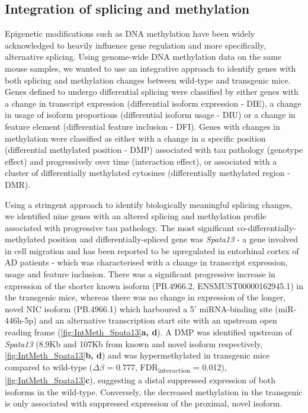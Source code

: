 \clearpage
\subsection{Integration of splicing and methylation}
Epigenetic modifications such as DNA methylation have been widely acknowledged to heavily influence gene regulation and more specifically, alternative splicing. Using genome-wide DNA methylation data on the same mouse samples, we wanted to use an integrative approach to identify genes with both splicing and methylation changes between wild-type and transgenic mice. Genes defined to undergo differential splicing were classified by either genes with a change in transcript expression (differential isoform expression - DIE), a change in usage of isoform proportions (differential isoform usage - DIU) or a change in feature element (differential feature inclusion - DFI). Genes with changes in methylation were classified as either with a change in a specific position (differential methylated position - DMP) associated with tau pathology (genotype effect) and progressively over time (interaction effect), or associated with a cluster of differentially methylated cytosines (differentially methylated region - DMR). 

Using a stringent approach to identify biologically meaningful splicing changes, we identified nine genes with an altered splicing and methylation profile associated with progressive tau pathology. The most significant co-differentially-methylated position and differentially-spliced gene was \textit{Spata13} - a gene involved in cell migration\cite{Bourbia2019} and has been reported to be upregulated in entorhinal cortex of AD patients\cite{Yan2019} - which was characterised with a change in transcript expression, usage and feature inclusion. There was a significant progressive increase in expression of the shorter known isoform (PB.4966.2, ENSMUST00000162945.1) in the transgenic mice, whereas there was no change in expression of the longer, novel NIC isoform (PB.4966.1) which harboured a 5' miRNA-binding site (miR-446h-5p) and an alternative transcription start site with an upstream open reading frame (\cref{fig:IntMeth_Spata13}\textbf{a, d}). A DMP was identified upstream of \textit{Spata13} (8.9Kb and 107Kb from known and novel isoform respectively, \cref{fig:IntMeth_Spata13}\textbf{b, d}) and was hypermethylated in transgenic mice compared to wild-type ($\Delta$$\beta$ = 0.777, FDR\textsubscript{interaction} = 0.012), \cref{fig:IntMeth_Spata13}\textbf{c}), suggesting a distal suppressed expression of both isoforms in the wild-type. Conversely, the decreased methylation in the transgenic is only associated with suppressed expression of the proximal, novel isoform. 

